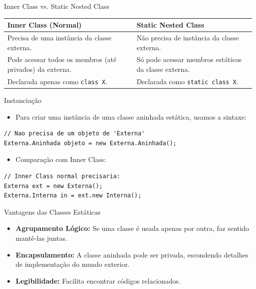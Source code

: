 \documentclass[9pt]{beamer}
\begin{document}
\begin{frame}{Inner Class vs. Static Nested Class}
    \centering
    \begin{tabular}{|p{4.5cm}|p{4.5cm}|}
        \hline
        \textbf{Inner Class (Normal)} & \textbf{Static Nested Class} \\ \hline
        Precisa de uma instância da classe externa. & Não precisa de instância da classe externa. \\ \hline
        Pode acessar todos os membros (até privados) da externa. & Só pode acessar membros estáticos da classe externa. \\ \hline
        Declarada apenas como \texttt{class X}. & Declarada como \texttt{static class X}. \\ \hline
    \end{tabular}
\end{frame}

\begin{frame}[fragile]{Instanciação}
    \begin{itemize}
        \item Para criar uma instância de uma classe aninhada estática, usamos a sintaxe:
    \end{itemize}
\begin{lstlisting}
// Nao precisa de um objeto de 'Externa'
Externa.Aninhada objeto = new Externa.Aninhada();
\end{lstlisting}
    \begin{itemize}
        \item Comparação com Inner Class:
    \end{itemize}
\begin{lstlisting}
// Inner Class normal precisaria:
Externa ext = new Externa();
Externa.Interna in = ext.new Interna();
\end{lstlisting}
\end{frame}

\begin{frame}{Vantagens das Classes Estáticas}
    \begin{itemize}
        \item \textbf{Agrupamento Lógico:} Se uma classe é usada apenas por outra, faz sentido mantê-las juntas.
        \item \textbf{Encapsulamento:} A classe aninhada pode ser privada, escondendo detalhes de implementação do mundo exterior.
        \item \textbf{Legibilidade:} Facilita encontrar códigos relacionados.
    \end{itemize}
\end{frame}
\end{document}

